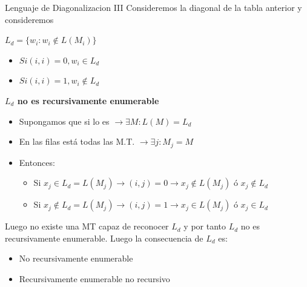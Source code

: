 \documentclass[11pt]{beamer}
\begin{document}
		
		\begin{frame}{Lenguaje de Diagonalizacion III}
			\justifying
			Consideremos la diagonal de la tabla anterior y consideremos
			
			\begin{multicols}{2}
		        \justifying
                \begin{center}
    			    $L_d = \{ {w_i: w_i \notin L(M_i)}\}$
    			\end{center}
                
                \columnbreak
                
                \begin{itemize}
                    \item $ Si (i,i)=0, w_i \in L_d$
                    \item $ Si  (i,i)=1, w_i \notin L_d$
                \end{itemize}
                
            \end{multicols}
            
			
			\textbf{ $L_d$ no es recursivamente enumerable }
			\begin{itemize}
                \item Supongamos que si lo es $\rightarrow \exists M : L(M) = L_d$
                \item En las filas está todas las M.T. $\rightarrow \exists j : M_j = M$
                \item Entonces:
                    \begin{itemize}
                        \item Si $x_j \in L_d = L(M_j) \rightarrow (i,j)=0 \rightarrow x_j \notin L(M_j) \text{ ó } x_j \notin L_d$
                        \item Si $x_j \notin L_d = L(M_j) \rightarrow (i,j)=1 \rightarrow x_j \in L(M_j) \text{ ó } x_j \in L_d$
                    \end{itemize}
            \end{itemize}
            
            Luego no existe una MT capaz de reconocer $L_d$ y por tanto $L_d$ no es recursivamente enumerable. Luego la consecuencia de $L_d$ es:

            \begin{itemize}
                \item No recursivamente enumerable
                \item Recursivamente enumerable no recursivo
            \end{itemize}
          
            
		\end{frame}
		
\end{document}
